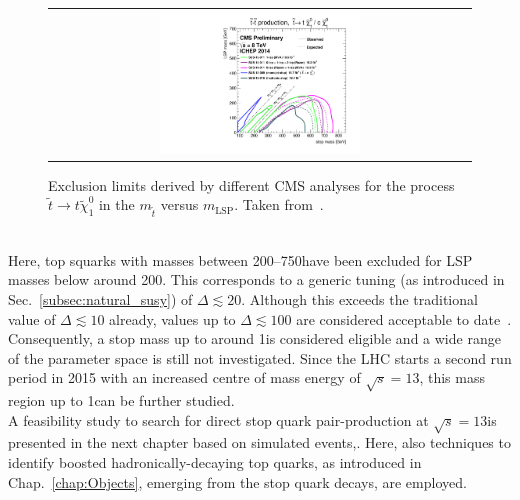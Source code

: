 \begin{figure}[!h]
  \centering
  \begin{tabular}{c}
                \includegraphics[width=0.49\textwidth]{figures/T2tt_ICHEP2014_All.pdf} 
  \end{tabular}
\caption{Exclusion limits derived by different CMS analyses for the process $\tilde{t} \rightarrow t\tilde{\chi}_1^0$ in the $m_{\tilde{t}}$ versus $m_\mathrm{LSP}$. Taken from~\cite{bib:CMS:PhysicsResultsSUS}.} 
  \label{fig:8TeV_stop_limits}
\end{figure}
\\
Here, top squarks with masses between 200--750\gev have been excluded for LSP masses below around 200\gev. This corresponds to a generic tuning (as introduced in Sec.~\ref{subsec:natural_susy}) of $\Delta \lesssim 20$. Although this exceeds the traditional value of $\Delta \lesssim 10$ already, values up to $\Delta \lesssim 100$ are considered acceptable to date~\cite{Craig:2013cxa}. Consequently, a stop mass up to around 1\tev is considered eligible and a wide range of the parameter space is still not investigated. Since the LHC starts a second run period in 2015 with an increased centre of mass energy of $\sqrt{s} = 13$\tev, this mass region up to 1\tev can be further studied.\\
A feasibility study to search for direct stop quark pair-production at $\sqrt{s} = 13$\tev is presented in the next chapter based on simulated events,. Here, also techniques to identify boosted hadronically-decaying top quarks, as introduced in Chap.~\ref{chap:Objects}, emerging from the stop quark decays, are employed.
